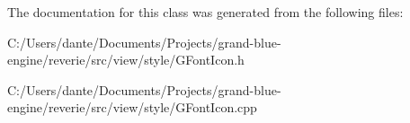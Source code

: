 The documentation for this class was generated from the following files\+:\begin{DoxyCompactItemize}
\item 
C\+:/\+Users/dante/\+Documents/\+Projects/grand-\/blue-\/engine/reverie/src/view/style/G\+Font\+Icon.\+h\item 
C\+:/\+Users/dante/\+Documents/\+Projects/grand-\/blue-\/engine/reverie/src/view/style/G\+Font\+Icon.\+cpp\end{DoxyCompactItemize}
